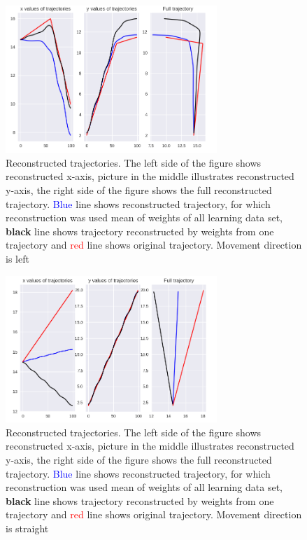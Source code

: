 \begin{figure}[H]
	\centering  	
	\includegraphics[width=8cm]{img/recLeft.png}
	\caption{Reconstructed trajectories. The left side of the figure shows reconstructed x-axis, picture in the middle illustrates reconstructed y-axis, the right side of the figure shows the full reconstructed trajectory. \textcolor{blue}{Blue} line shows reconstructed trajectory, for which reconstruction was used mean of weights of all learning data set, \textbf{black} line shows trajectory reconstructed by weights from one trajectory and \textcolor{red}{red} line shows original trajectory. Movement direction is left}
	\label{fig:recLeft}    
\end{figure}

\begin{figure}[H]
	\centering  	
	\includegraphics[width=8cm]{img/recStraight.png}
	\caption{Reconstructed trajectories. The left side of the figure shows reconstructed x-axis, picture in the middle illustrates reconstructed y-axis, the right side of the figure shows the full reconstructed trajectory. \textcolor{blue}{Blue} line shows reconstructed trajectory, for which reconstruction was used mean of weights of all learning data set, \textbf{black} line shows trajectory reconstructed by weights from one trajectory and \textcolor{red}{red} line shows original trajectory. Movement direction is straight}
	\label{fig:recStraight}    
\end{figure}

